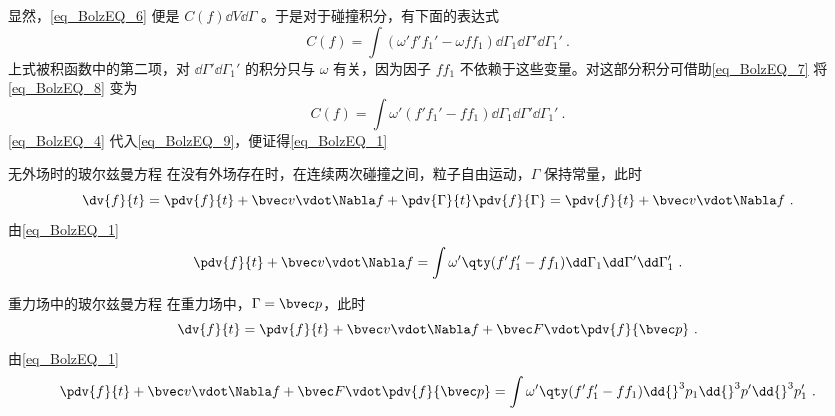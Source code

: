 显然，\autoref{eq_BolzEQ_6} 便是 $C(f)\dd V\dd\Gamma$ 。于是对于碰撞积分，有下面的表达式
\begin{equation}\label{eq_BolzEQ_8}
C(f)=\int(\omega'f'f_1'-\omega f f_1)\dd\Gamma_1\dd\Gamma'\dd\Gamma_1'~.
\end{equation}
上式被积函数中的第二项，对 $\dd\Gamma'\dd\Gamma_1'$ 的积分只与 $\omega$ 有关，因为因子 $ff_1$ 不依赖于这些变量。对这部分积分可借助\autoref{eq_BolzEQ_7} 将\autoref{eq_BolzEQ_8} 变为
\begin{equation}\label{eq_BolzEQ_9}
C(f)=\int\omega'(f'f_1'- f f_1)\dd\Gamma_1\dd\Gamma'\dd\Gamma_1'~.
\end{equation}
\autoref{eq_BolzEQ_4} 代入\autoref{eq_BolzEQ_9}，便证得\autoref{eq_BolzEQ_1} 
\begin{example}{无外场时的玻尔兹曼方程}
在没有外场存在时，在连续两次碰撞之间，粒子自由运动，$\Gamma$ 保持常量，此时
\begin{equation}
\dv{f}{t}=\pdv{f}{t}+\bvec v\vdot \Nabla f+\pdv{\Gamma}{t}\pdv{f}{\Gamma}=\pdv{f}{t}+\bvec v\vdot \Nabla f~.
\end{equation}
由\autoref{eq_BolzEQ_1} 
\begin{equation}
\pdv{f}{t}+\bvec v\vdot \Nabla f=\int\omega'\qty(f'f_1'-ff_1)\dd\Gamma_1\dd\Gamma'\dd\Gamma_1'~.
\end{equation}
\end{example}
\begin{example}{重力场中的玻尔兹曼方程}
在重力场中，$\Gamma=\bvec p$，此时
\begin{equation}
\dv{f}{t}=\pdv{f}{t}+\bvec v\vdot \Nabla f+\bvec F\vdot\pdv{f}{\bvec p}~.
\end{equation}
由\autoref{eq_BolzEQ_1} 
\begin{equation}
\pdv{f}{t}+\bvec v\vdot \Nabla f+\bvec F\vdot\pdv{f}{\bvec p}=\int\omega'\qty(f'f_1'-ff_1)\dd{}^3  p_1\dd {}^3p'\dd{}^3 p_1'~.
\end{equation}
\end{example}

